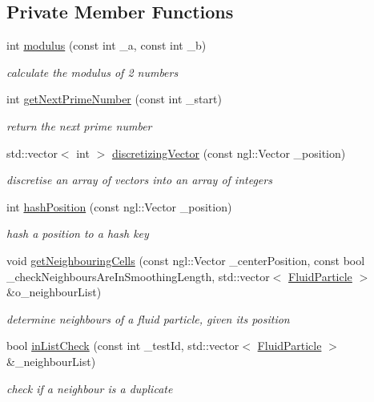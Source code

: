 \subsection*{Private Member Functions}
\begin{DoxyCompactItemize}
\item 
int \hyperlink{class_spatial_hashing_a810e4bfd1e5ec0869dfa3bdefd3a1d42}{modulus} (const int \_\-a, const int \_\-b)
\begin{DoxyCompactList}\small\item\em calculate the modulus of 2 numbers \item\end{DoxyCompactList}\item 
int \hyperlink{class_spatial_hashing_ab9a10a48fe163699f3e35e36d310254d}{getNextPrimeNumber} (const int \_\-start)
\begin{DoxyCompactList}\small\item\em return the next prime number \item\end{DoxyCompactList}\item 
std::vector$<$ int $>$ \hyperlink{class_spatial_hashing_addbd2cd5fde1521533a54ade79787dde}{discretizingVector} (const ngl::Vector \_\-position)
\begin{DoxyCompactList}\small\item\em discretise an array of vectors into an array of integers \item\end{DoxyCompactList}\item 
int \hyperlink{class_spatial_hashing_a7bfce8fdfb8f8afe9a23fe1fe39875fe}{hashPosition} (const ngl::Vector \_\-position)
\begin{DoxyCompactList}\small\item\em hash a position to a hash key \item\end{DoxyCompactList}\item 
void \hyperlink{class_spatial_hashing_ad75a31f38142a1c2a03eda6afed94db3}{getNeighbouringCells} (const ngl::Vector \_\-centerPosition, const bool \_\-checkNeighboursAreInSmoothingLength, std::vector$<$ \hyperlink{class_fluid_particle}{FluidParticle} $>$ \&o\_\-neighbourList)
\begin{DoxyCompactList}\small\item\em determine neighbours of a fluid particle, given its position \item\end{DoxyCompactList}\item 
bool \hyperlink{class_spatial_hashing_ac8700af92ae1d6729b29307926bd2a09}{inListCheck} (const int \_\-testId, std::vector$<$ \hyperlink{class_fluid_particle}{FluidParticle} $>$ \&\_\-neighbourList)
\begin{DoxyCompactList}\small\item\em check if a neighbour is a duplicate \item\end{DoxyCompactList}\end{DoxyCompactItemize}
